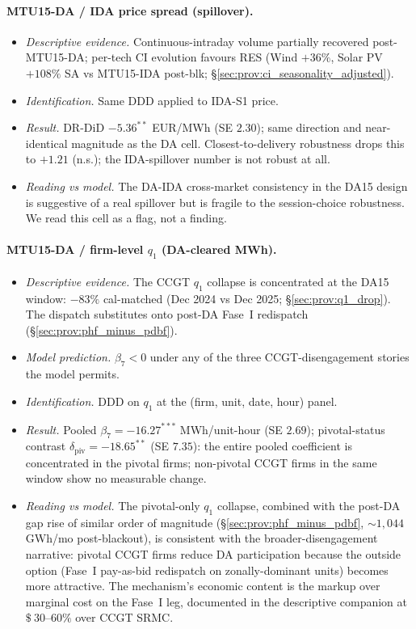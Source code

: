 \documentclass[11pt,a4paper]{article}
\begin{document}
\paragraph{MTU15-DA / IDA price spread (spillover).}
\begin{itemize}
\item \emph{Descriptive evidence.} Continuous-intraday volume partially recovered post-MTU15-DA; per-tech CI evolution favours RES (Wind $+36\%$, Solar PV $+108\%$ SA vs MTU15-IDA post-blk; \S\ref{sec:prov:ci_seasonality_adjusted}).
\item \emph{Identification.} Same DDD applied to IDA-S1 price.
\item \emph{Result.} DR-DiD $-5.36^{**}$ EUR/MWh (SE $2.30$); same direction and near-identical magnitude as the DA cell. Closest-to-delivery robustness drops this to $+1.21$ (n.s.); the IDA-spillover number is not robust at all.
\item \emph{Reading vs model.} The DA-IDA cross-market consistency in the DA15 design is suggestive of a real spillover but is fragile to the session-choice robustness. We read this cell as a flag, not a finding.
\end{itemize}

\paragraph{MTU15-DA / firm-level $q_1$ (DA-cleared MWh).}
\begin{itemize}
\item \emph{Descriptive evidence.} The CCGT $q_1$ collapse is concentrated at the DA15 window: $-83\%$ cal-matched (Dec 2024 vs Dec 2025; \S\ref{sec:prov:q1_drop}). The dispatch substitutes onto post-DA Fase~I redispatch (\S\ref{sec:prov:phf_minus_pdbf}).
\item \emph{Model prediction.} $\beta_7 < 0$ under any of the three CCGT-disengagement stories the model permits.
\item \emph{Identification.} DDD on $q_1$ at the (firm, unit, date, hour) panel.
\item \emph{Result.} Pooled $\beta_7 = -16.27^{***}$ MWh/unit-hour (SE $2.69$); pivotal-status contrast $\delta_{\text{piv}} = -18.65^{**}$ (SE $7.35$): the entire pooled coefficient is concentrated in the pivotal firms; non-pivotal CCGT firms in the same window show no measurable change.
\item \emph{Reading vs model.} The pivotal-only $q_1$ collapse, combined with the post-DA gap rise of similar order of magnitude (\S\ref{sec:prov:phf_minus_pdbf}, $\sim 1{,}044$ GWh/mo post-blackout), is consistent with the broader-disengagement narrative: pivotal CCGT firms reduce DA participation because the outside option (Fase~I pay-as-bid redispatch on zonally-dominant units) becomes more attractive. The mechanism's economic content is the markup over marginal cost on the Fase~I leg, documented in the descriptive companion at $\$~30$--$60\%$ over CCGT SRMC.
\end{itemize}
\end{document}
